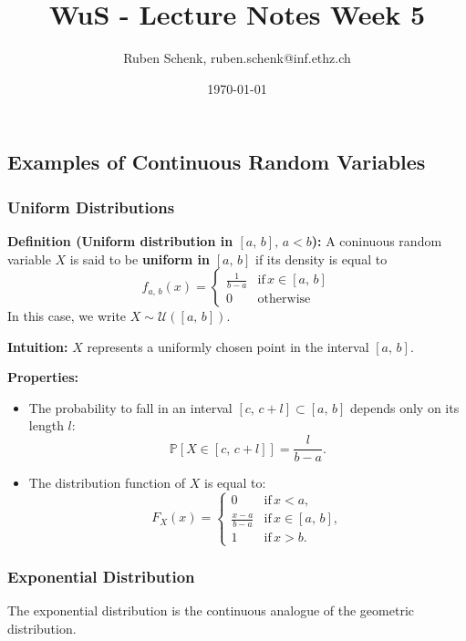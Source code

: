 \documentclass[a4paper]{extarticle}
\title{WuS - Lecture Notes Week 5}
\author{Ruben Schenk, ruben.schenk@inf.ethz.ch}
\date{\today}
\begin{document}
\maketitle

\subsection{Examples of Continuous Random Variables}

\subsubsection{Uniform Distributions}

\textbf{Definition (Uniform distribution in \([a, \, b], \, a < b\)):} A coninuous random variable \(X\) is said to be \textbf{uniform in} \([a, \, b]\) if its density is equal to
\[
    f_{a, \, b}(x) = \begin{cases}
        \frac{1}{b - a} & \text{if} \, x \in [a, \, b]\\
        0 & \text{otherwise}
    \end{cases}
\]
In this case, we write \(X \sim \mathcal{U}([a, \, b])\).

\textbf{Intuition:} \(X\) represents a uniformly chosen point in the interval \([a, \, b]\).

\textbf{Properties:}
\begin{itemize}
    \item The probability to fall in an interval \([c, \, c + l] \subset [a, \, b]\) depends only on its length \(l\):
    \[
        \mathbb{P}[X \in [c, \, c + l]] = \frac{l}{b - a}.
    \]
    \item The distribution function of \(X\) is equal to:
    \[
        F_X(x) = \begin{cases}
            0 & \text{if} \, x < a,\\
            \frac{x-a}{b-a} & \text{if} \, x \in [a, \, b],\\
            1 & \text{if} \, x > b.
        \end{cases}
    \]
\end{itemize}

\subsubsection{Exponential Distribution}

The exponential distribution is the continuous analogue of the geometric distribution.
\end{document}
